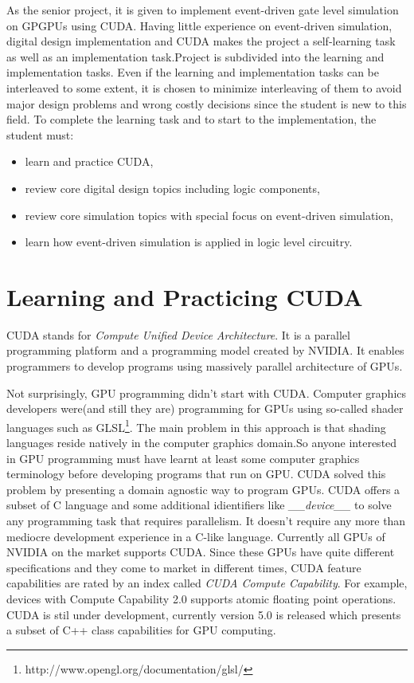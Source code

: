 \documentclass[a4paper,onesided,12pt]{report}
\begin{document}
 
 As the senior project, it is given to implement event-driven gate level simulation on GPGPUs using CUDA. Having little experience on event-driven simulation, digital design implementation and CUDA makes the project a self-learning task as well as an implementation task.Project is subdivided into the learning and implementation tasks. Even if the learning and implementation tasks can be interleaved to some extent, it is chosen to minimize interleaving of them to avoid major design problems and wrong costly decisions since the student is new to this field. To complete the learning task and to start to the implementation, the student must:
 \begin{itemize}
 \item learn and practice CUDA, 
 \item review core digital design topics including logic components,
 \item review core simulation topics with special focus on event-driven simulation,
 \item learn how event-driven simulation is applied in logic level circuitry. 
 \end{itemize} 
 
 \section{Learning and Practicing CUDA}
 
 CUDA stands for \emph{Compute Unified Device Architecture}. It is a parallel programming platform and a programming model created by NVIDIA. It enables programmers to develop programs using massively parallel architecture of GPUs.
 
 Not surprisingly, GPU programming didn't start with CUDA. Computer graphics developers were(and still they are) programming for GPUs using so-called shader languages such as GLSL\footnote{http://www.opengl.org/documentation/glsl/}. The main problem in this approach is that shading languages reside natively in the computer graphics domain.So anyone interested in GPU programming must have learnt at least some computer graphics terminology before developing programs that run on GPU. CUDA solved this problem by presenting a domain agnostic way to program GPUs. CUDA offers a subset of C language and some additional idientifiers like \emph{\_\_device\_\_} to solve any programming task that requires parallelism. It doesn't require any more than mediocre development experience in a C-like language. Currently all GPUs of NVIDIA on the market supports CUDA. Since these GPUs have quite different specifications and they come to market in different times, CUDA feature capabilities are rated by an index called \emph{CUDA Compute Capability}. For example, devices with Compute Capability 2.0 supports atomic floating point operations. CUDA is stil under development, currently version 5.0 is released which presents a subset of C++ class capabilities for GPU computing. 
 
\end{document}

